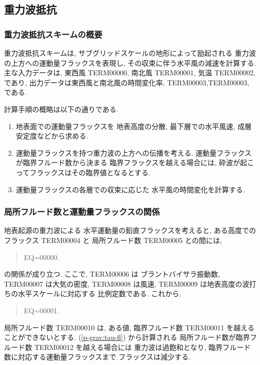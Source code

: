 ﻿
\subsection{重力波抵抗}

\subsubsection{重力波抵抗スキームの概要}

重力波抵抗スキームは,
サブグリッドスケールの地形によって励起される
重力波の上方への運動量フラックスを表現し,
その収束に伴う水平風の減速を計算する.
主な入力データは, 東西風 TERM00000, 南北風 TERM00001, 気温 TERM00002, であり,
出力データは東西風と南北風の時間変化率,
TERM00003,TERM00003, である.

計算手順の概略は以下の通りである.
%
\begin{enumerate}
\item 地表面での運動量フラックスを
      地表高度の分散, 
      最下層での水平風速, 成層安定度などから求める.
\item 運動量フラックスを持つ重力波の上方への伝播を考える.
      運動量フラックスが臨界フルード数から決まる
      臨界フラックスを越える場合には,
      砕波が起こってフラックスはその臨界値となるとする.
\item 運動量フラックスの各層での収束に応じた
      水平風の時間変化を計算する.
\end{enumerate}

\subsubsection{局所フルード数と運動量フラックスの関係}

地表起源の重力波による
水平運動量の鉛直フラックスを考えると,
ある高度でのフラックス TERM00004 と
局所フルード数 TERM00005 との間には,
\begin{quote}
EQ=00000.
\label{p-grav:tau-fl}
\end{quote}
の関係が成り立つ.
ここで, TERM00006 は
ブラントバイサラ振動数, 
TERM00007 は大気の密度, 
TERM00008 は風速, TERM00009 は地表高度の波打ちの水平スケールに対応する
比例定数である.
これから,
\begin{quote}
EQ=00001.
\label{p-grav:fl-tau}
\end{quote}

局所フルード数 TERM00010 は,
ある値, 臨界フルード数 TERM00011 を越えることができないとする.
(\ref{p-grav:tau-fl}) から計算される
局所フルード数が臨界フルード数 TERM00012 を越える場合には
重力波は過飽和となり,
臨界フルード数に対応する運動量フラックスまで
フラックスは減少する.


